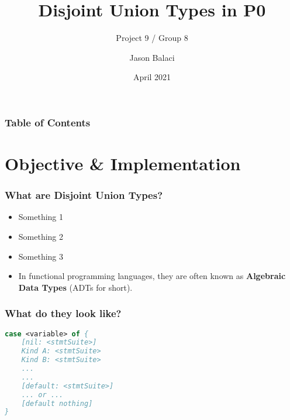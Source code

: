 \documentclass{beamer}
\title[Disjoint Union Types]{Disjoint Union Types in P0}
\subtitle{Project 9 / Group 8}
\author{Jason Balaci}
\institute{McMaster University}
\date{April 2021}
\begin{document}
\frame{\titlepage}

\begin{frame}
\frametitle{Table of Contents}
\tableofcontents
\end{frame}

\section{Objective \& Implementation}

\begin{frame}
\frametitle{What are Disjoint Union Types?}

\begin{itemize}
 \item<1-> Something 1
 \item<2-> Something 2
 \item<3-> Something 3
 \item<4-> In functional programming languages, they are often known as \textbf{Algebraic Data Types} (ADTs for short).
\end{itemize}

\end{frame}

\begin{frame}
\frametitle{What do they look like?}
\end{frame}

\begin{lrbox}{\anatomyOfCaseBox}
\begin{lstlisting}[language=Pascal, basicstyle=\footnotesize]
case <variable> of {
    [nil: <stmtSuite>]
    Kind A: <stmtSuite>
    Kind B: <stmtSuite>
    ...
    ...
    [default: <stmtSuite>]
    ... or ...
    [default nothing]
}
\end{lstlisting}
\end{lrbox}
\end{document}
